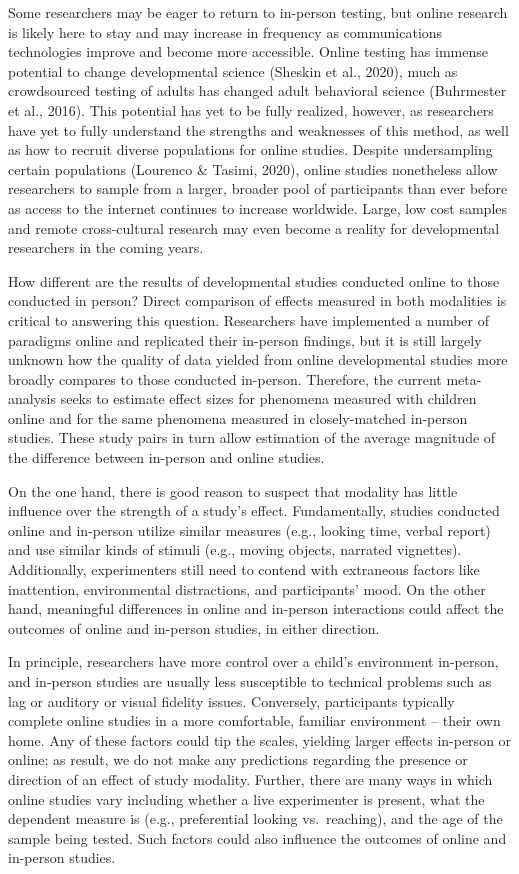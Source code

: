 \documentclass[
  man,floatsintext]{apa6}
\begin{document}
Some researchers may be eager to return to in-person testing, but online research is likely here to stay and may increase in frequency as communications technologies improve and become more accessible. Online testing has immense potential to change developmental science (Sheskin et al., 2020), much as crowdsourced testing of adults has changed adult behavioral science (Buhrmester et al., 2016). This potential has yet to be fully realized, however, as researchers have yet to fully understand the strengths and weaknesses of this method, as well as how to recruit diverse populations for online studies. Despite undersampling certain populations (Lourenco \& Tasimi, 2020), online studies nonetheless allow researchers to sample from a larger, broader pool of participants than ever before as access to the internet continues to increase worldwide. Large, low cost samples and remote cross-cultural research may even become a reality for developmental researchers in the coming years.

How different are the results of developmental studies conducted online to those conducted in person? Direct comparison of effects measured in both modalities is critical to answering this question. Researchers have implemented a number of paradigms online and replicated their in-person findings, but it is still largely unknown how the quality of data yielded from online developmental studies more broadly compares to those conducted in-person. Therefore, the current meta-analysis seeks to estimate effect sizes for phenomena measured with children online and for the same phenomena measured in closely-matched in-person studies. These study pairs in turn allow estimation of the average magnitude of the difference between in-person and online studies.

On the one hand, there is good reason to suspect that modality has little influence over the strength of a study's effect. Fundamentally, studies conducted online and in-person utilize similar measures (e.g., looking time, verbal report) and use similar kinds of stimuli (e.g., moving objects, narrated vignettes). Additionally, experimenters still need to contend with extraneous factors like inattention, environmental distractions, and participants' mood. On the other hand, meaningful differences in online and in-person interactions could affect the outcomes of online and in-person studies, in either direction.

In principle, researchers have more control over a child's environment in-person, and in-person studies are usually less susceptible to technical problems such as lag or auditory or visual fidelity issues. Conversely, participants typically complete online studies in a more comfortable, familiar environment -- their own home. Any of these factors could tip the scales, yielding larger effects in-person or online; as result, we do not make any predictions regarding the presence or direction of an effect of study modality. Further, there are many ways in which online studies vary including whether a live experimenter is present, what the dependent measure is (e.g., preferential looking vs.~reaching), and the age of the sample being tested. Such factors could also influence the outcomes of online and in-person studies.
\end{document}
